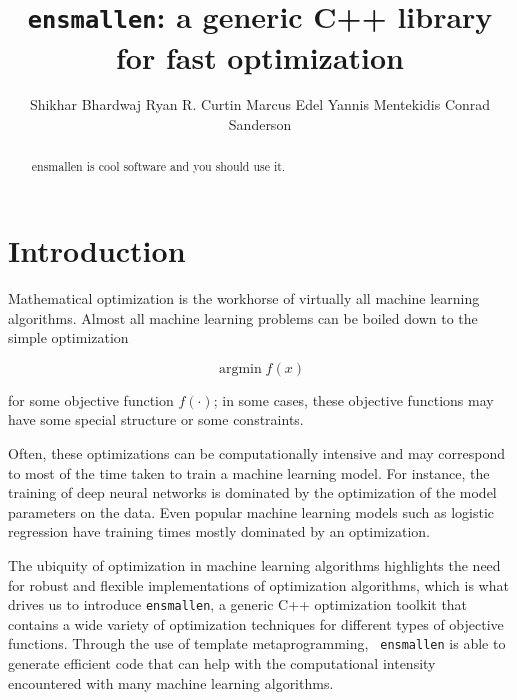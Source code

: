 \documentclass{article}
\begin{document}
\title{\texttt{ensmallen}: a generic C++ library for fast optimization}

\author{Shikhar Bhardwaj \And Ryan R. Curtin \And Marcus Edel \And Yannis
Mentekidis \And Conrad Sanderson}

\maketitle

\begin{abstract}
ensmallen is cool software and you should use it.
\end{abstract}

\section{Introduction}

Mathematical optimization is the workhorse of virtually all machine learning
algorithms.  Almost all machine learning problems can be boiled down to the
simple optimization

\begin{equation}
\operatorname{argmin} f(x)
\end{equation}

\noindent for some objective function $f(\cdot)$; in some cases, these objective
functions may have some special structure or some constraints.

Often, these optimizations can be computationally intensive and may correspond
to most of the time taken to train a machine learning model.  For instance, the
training of deep neural networks is dominated by the optimization of the model
parameters on the data. %
Even popular machine learning models such as logistic regression %
have training times mostly dominated by an optimization.
%

The ubiquity of optimization in machine learning algorithms highlights the need
for robust and flexible implementations of optimization algorithms, which is
what drives us to introduce {\tt ensmallen}, a generic C++ optimization toolkit
that contains a wide variety of optimization techniques for different types of
objective functions.  Through the use of template metaprogramming, {\tt
ensmallen} is able to generate efficient code that can help with the
computational intensity encountered with many machine learning algorithms.
\end{document}
